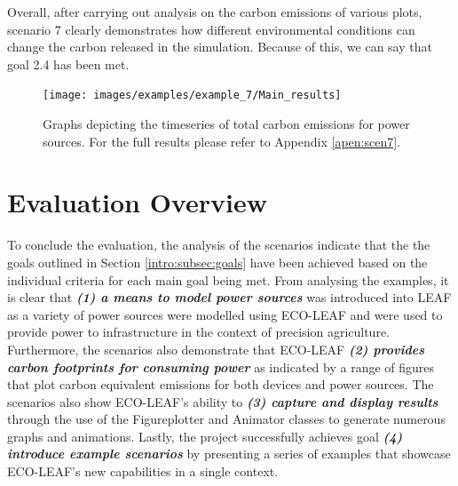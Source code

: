 \documentclass{l4proj}
\begin{document}
Overall, after carrying out analysis on the carbon emissions of various plots, scenario 7 clearly demonstrates how different environmental conditions can change the carbon released in the simulation.
Because of this, we can say that goal 2.4 has been met.\begin{figure}[h]
    \centering
    \texttt{[image: images/examples/example\_7/Main\_results]}
    ~
    \caption{Graphs depicting the timeseries of total carbon emissions for power sources. For the full results please refer to Appendix \ref{apen:scen7}.}
    \label{fig:example7_final_results}
\end{figure}

\section{Evaluation Overview}
To conclude the evaluation, the analysis of the scenarios indicate that the the goals outlined in Section \ref{intro:subsec:goals} have been achieved based on the individual criteria for each main goal being met.
From analysing the examples, it is clear that \textit{\textbf{(1) a means to model power sources}} was introduced into LEAF as a variety of power sources were modelled using ECO-LEAF and were used to provide power to infrastructure in the context of precision agriculture.
Furthermore, the scenarios also demonstrate that ECO-LEAF \textit{\textbf{(2) provides carbon footprints for consuming power}} as indicated by a range of figures that plot carbon equivalent emissions for both devices and power sources.
The scenarios also show ECO-LEAF's ability to \textit{\textbf{(3) capture and display results}} through the use of the Figureplotter and Animator classes to generate numerous graphs and animations.
Lastly, the project successfully achieves goal \textit{\textbf{(4) introduce example scenarios}} by presenting a series of examples that showcase ECO-LEAF's new capabilities in a single context.
\end{document}
